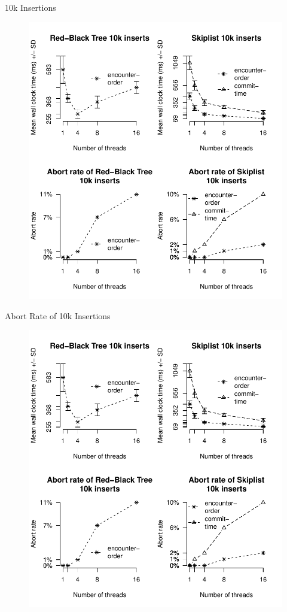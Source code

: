 \begin{frame}{10k Insertions}
\begin{figure}
    \centering
    \includegraphics[width=\textwidth]{images/plots10k-insert.pdf}
\end{figure}
\end{frame}

\begin{frame}{Abort Rate of 10k Insertions}
\begin{figure}
    \centering
    \includegraphics[width=\textwidth]{images/plots10k-abort.pdf}
\end{figure}
\end{frame}


